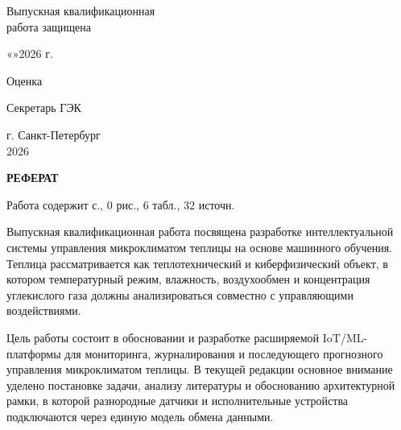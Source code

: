 \documentclass[a4paper,14pt]{extarticle}
\newcommand{\VkrStructuralSectionNoToc}[1]{%
  \begin{center}\bfseries #1\end{center}%
  \par\nopagebreak\vspace{12pt}%
}
\begin{document}
\begin{titlepage}
\vspace{0.4cm}

\begin{flushright}
\begin{minipage}{0.46\textwidth}
Выпускная квалификационная\\
работа защищена

\vspace{0.15cm}

«\underline{\hspace{0.8cm}}»\underline{\hspace{2.5cm}}2026 г.

\vspace{0.18cm}

Оценка

\vspace{0.12cm}

\underline{\hspace{3.0cm}}

\vspace{0.18cm}

Секретарь ГЭК \underline{\hspace{2.2cm}}
\end{minipage}
\end{flushright}

\vfill

\begin{center}
г. Санкт-Петербург\\
2026
\end{center}
\end{titlepage}

\setcounter{page}{2}
\hypersetup{pageanchor=true}

\VkrStructuralSectionNoToc{РЕФЕРАТ}\label{ux440ux435ux444ux435ux440ux430ux442}

Работа содержит \pageref{LastPage} с., 0 рис., 6 табл., 32 источн.

Выпускная квалификационная работа посвящена разработке интеллектуальной
системы управления микроклиматом теплицы на основе машинного обучения.
Теплица рассматривается как теплотехнический и киберфизический объект, в
котором температурный режим, влажность, воздухообмен и концентрация
углекислого газа должны анализироваться совместно с управляющими
воздействиями.

Цель работы состоит в обосновании и разработке расширяемой
IoT/ML-платформы для мониторинга, журналирования и последующего
прогнозного управления микроклиматом теплицы. В текущей редакции
основное внимание уделено постановке задачи, анализу литературы и
обоснованию архитектурной рамки, в которой разнородные датчики и
исполнительные устройства подключаются через единую модель обмена
данными.
\end{document}
